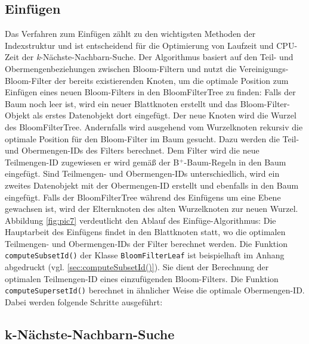 \subsection{Einfügen}\label{sec:einfügen}
Das Verfahren zum Einfügen zählt zu den wichtigsten Methoden der Indexstruktur und ist entscheidend für die Optimierung von Laufzeit und CPU-Zeit der \textit{k}-Nächste-Nachbarn-Suche. Der Algorithmus basiert auf den Teil- und Obermengenbeziehungen zwischen Bloom-Filtern und nutzt die Vereinigungs-Bloom-Filter der bereits existierenden Knoten, um die optimale Position zum Einfügen eines neuen Bloom-Filters in den BloomFilterTree zu finden: Falls der Baum noch leer ist, wird ein neuer Blattknoten erstellt und das Bloom-Filter-Objekt als erstes Datenobjekt dort eingefügt. Der neue Knoten wird die Wurzel des BloomFilterTree. Andernfalls wird ausgehend vom Wurzelknoten rekursiv die optimale Position für den Bloom-Filter im Baum gesucht. Dazu werden die Teil- und Obermengen-IDs des Filters berechnet. Dem Filter wird die neue Teilmengen-ID zugewiesen er wird gemäß der B$^+$-Baum-Regeln in den Baum eingefügt. Sind Teilmengen- und Obermengen-IDs unterschiedlich, wird ein zweites Datenobjekt mit der Obermengen-ID erstellt und ebenfalls in den Baum eingefügt. Falls der BloomFilterTree während des Einfügens um eine Ebene gewachsen ist, wird der Elternknoten des alten Wurzelknoten zur neuen Wurzel. Abbildung \ref{fig:pic7} verdeutlicht den Ablauf des Einfüge-Algorithmus:  
Die Hauptarbeit des Einfügens findet in den Blattknoten statt, wo die optimalen Teilmengen- und Obermengen-IDs der Filter berechnet werden. Die Funktion \texttt{computeSubsetId()} der Klasse \texttt{BloomFilterLeaf} ist beispielhaft im Anhang abgedruckt (vgl. \ref{sec:computeSubsetId()}). Sie dient der Berechnung der optimalen Teilmengen-ID eines einzufügenden Bloom-Filters. Die Funktion \texttt{computeSupersetId()} berechnet in ähnlicher Weise die optimale Obermengen-ID. Dabei werden folgende Schritte ausgeführt: 
\subsection{k-Nächste-Nachbarn-Suche}\label{sec:knn}
